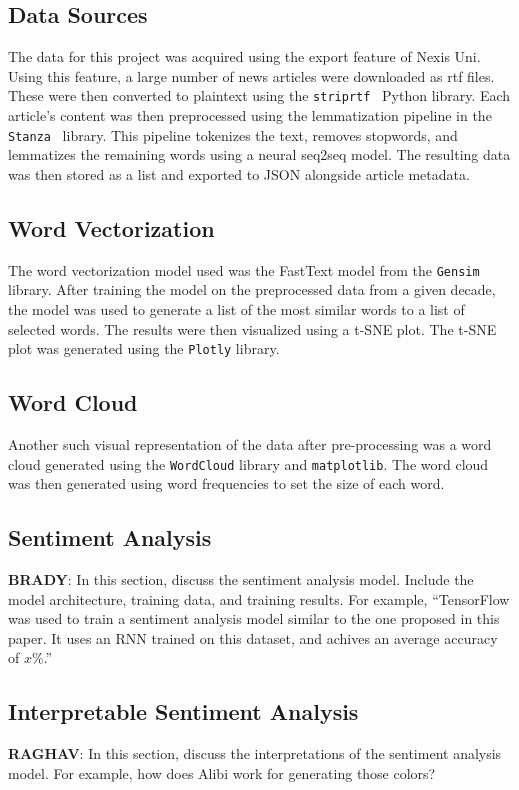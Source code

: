 \documentclass[11pt,a4paper, twocolumn]{article}
\begin{document}
\subsection{Data Sources}

The data for this project was acquired using the export feature of Nexis Uni. Using this feature, a large number of news articles were downloaded as rtf files. These were then converted to plaintext using the \texttt{striprtf}~\citep{striprtf} Python library. Each article's content was then preprocessed using the lemmatization pipeline in the \texttt{Stanza}~\citep{stanza} library. This pipeline tokenizes the text, removes stopwords, and lemmatizes the remaining words using a neural seq2seq model. The resulting data was then stored as a list and exported to JSON alongside article metadata.

\subsection{Word Vectorization}

The word vectorization model used was the FastText model from the \texttt{Gensim} library. After training the model on the preprocessed data from a given decade, the model was used to generate a list of the most similar words to a list of selected words. The results were then visualized using a t-SNE plot. The t-SNE plot was generated using the \texttt{Plotly} library.

\subsection{Word Cloud}

Another such visual representation of the data after pre-processing was a word cloud generated using the \texttt{WordCloud} library and \texttt{matplotlib}. The word cloud was then generated using word frequencies to set the size of each word.

\subsection{Sentiment Analysis}
\textbf{BRADY}: In this section, discuss the sentiment analysis model. Include the model architecture, training data, and training results. For example, ``TensorFlow was used to train a sentiment analysis model similar to the one proposed in this paper. It uses an RNN trained on this dataset, and achives an average accuracy of $x$\%.''

\subsection{Interpretable Sentiment Analysis}
\textbf{RAGHAV}: In this section, discuss the interpretations of the sentiment analysis model. For example, how does Alibi work for generating those colors?
\end{document}
